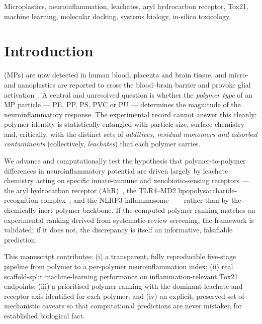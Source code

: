 \documentclass[journal]{IEEEtran}
\begin{document}
\begin{IEEEkeywords}
Microplastics, neuroinflammation, leachates, aryl hydrocarbon receptor, Tox21,
machine learning, molecular docking, systems biology, in-silico toxicology.
\end{IEEEkeywords}

\section{Introduction}
 (MPs) are now detected in human blood, placenta
and brain tissue, and micro- and nanoplastics are reported to cross the
blood--brain barrier and provoke glial activation~\cite{prust2020}. A central and
unresolved question is whether the \emph{polymer type} of an MP particle --- PE,
PP, PS, PVC or PU --- determines the magnitude of the neuroinflammatory response.
The experimental record cannot answer this cleanly: polymer identity is
statistically entangled with particle size, surface chemistry and, critically,
with the distinct sets of \emph{additives, residual monomers and adsorbed
contaminants} (collectively, \emph{leachates}) that each polymer carries.

We advance and computationally test the hypothesis that polymer-to-polymer
differences in neuroinflammatory potential are driven largely by leachate
chemistry acting on specific innate-immune and xenobiotic-sensing receptors ---
the aryl hydrocarbon receptor (AhR)~\cite{rothhammer2019}, the TLR4--MD2
lipopolysaccharide-recognition complex~\cite{park2013}, and the NLRP3
inflammasome~\cite{swanson2019} --- rather than by the chemically inert polymer
backbone. If the computed polymer ranking matches an experimental ranking derived
from systematic-review screening, the framework is validated; if it does not, the
discrepancy is itself an informative, falsifiable prediction.

This manuscript contributes: (i) a transparent, fully reproducible five-stage
pipeline from polymer to a per-polymer neuroinflammation index; (ii) real
scaffold-split machine-learning performance on inflammation-relevant Tox21
endpoints; (iii) a prioritised polymer ranking with the dominant leachate and
receptor axis identified for each polymer; and (iv) an explicit, preserved set of
mechanistic caveats so that computational predictions are never mistaken for
established biological fact.
\end{document}
